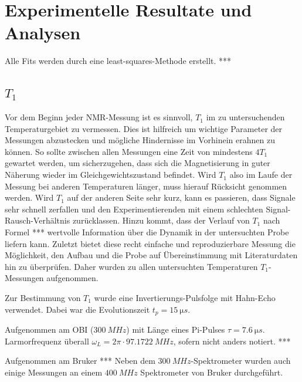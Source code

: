 \chapter{Experimentelle Resultate und Analysen}
\label{chapter:experiment}

Alle Fits werden durch eine least-squares-Methode erstellt. ***

\section{$T_1$} \label{section:res:T_1}

Vor dem Beginn jeder NMR-Messung ist es sinnvoll, $T_1$ im zu untersuchenden Temperaturgebiet zu vermessen. Dies ist hilfreich um wichtige Parameter der Messungen abzustecken und mögliche Hindernisse im Vorhinein erahnen zu können. So sollte zwischen allen Messungen eine Zeit von mindestens $4 T_1$ gewartet werden, um sicherzugehen, dass sich die Magnetisierung in guter Näherung wieder im Gleichgewichtszustand befindet. Wird $T_1$ also im Laufe der Messung bei anderen Temperaturen länger, muss hierauf Rücksicht genommen werden. Wird $T_1$ auf der anderen Seite sehr kurz, kann es passieren, dass Signale sehr schnell zerfallen und den Experimentierenden mit einem schlechten Signal-Rausch-Verhältnis zurücklassen. Hinzu kommt, dass der Verlauf von $T_1$ nach Formel *** wertvolle Information über die Dynamik in der untersuchten Probe liefern kann. Zuletzt bietet diese recht einfache und reproduzierbare Messung die Möglichkeit, den Aufbau und die Probe auf Übereinstimmung mit Literaturdaten hin zu überprüfen. Daher wurden zu allen untersuchten Temperaturen $T_1$-Messungen aufgenommen.

Zur Bestimmung von $T_1$ wurde eine Invertierungs-Pulsfolge mit Hahn-Echo verwendet. Dabei war die Evolutionszeit $t_p = \SI{15}{\micro s}$.

Aufgenommen am OBI ($\SI{300}{MHz}$) mit Länge eines Pi-Pulses $\tau = \SI{7.6}{\micro s}$. Larmorfrequenz überall $\omega_L = 2 \pi \cdot \SI{97.1722}{MHz}$, sofern nicht anders notiert. ***

Aufgenommen am Bruker ***  Neben dem $\SI{300}{MHz}$-Spektrometer wurden auch einige Messungen an einem $\SI{400}{MHz}$ Spektrometer von Bruker durchgeführt.


